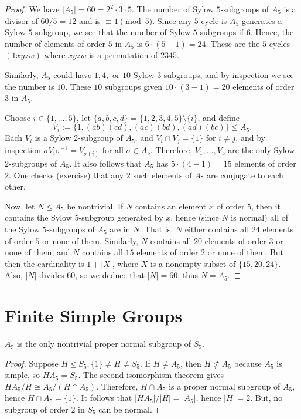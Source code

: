 \begin{proof}
    We have $|A_5|=60=2^2\cdot 3\cdot 5$. The number of Sylow $5$-subgroups of $A_5$ is a divisor of $60/5=12$ and is $\equiv 1 \pmod 5$. Since any $5$-cycle is $A_5$ generates a Sylow $5$-subgroup, we see that the number of Sylow $5$-subgroups if $6$. Hence, the number of elements of order $5$ in $A_5$ is $6\cdot (5-1)=24$. These are the $5$-cycles $(1xyzw)$ where $xyzw$ is a permutation of $2345$.

    Similarly, $A_5$ could have $1,4,$ or $10$ Sylow $3$-subgroups, and by inspection we see the number is $10$. These $10$ subgroups given $10\cdot(3-1)=20$ elements of order $3$ in $A_5$.

    Choose $i \in \{1,\dots,5\}$, let $\{a,b,c,d\}=\{1,2,3,4,5\}\setminus\{i\}$, and define
    $$V_i:=\{1,(ab)(cd),(ac)(bd),(ad)(bc)\} \leq A_5.$$
    Each $V_i$ is a Sylow $2$-subgroup of $A_5$, and $V_i \cap V_j = \{1\}$ for $i \neq j$, and by inspection $\sigma V_i\sigma ^{-1}=V_{\sigma(i)}$ for all $\sigma \in A_5$. Therefore, $V_1,\dots,V_5$ are the only Sylow $2$-subgroups of $A_5$. It also follows that $A_5$ has $5 \cdot (4-1)=15$ elements of order $2$. One checks (exercise) that any $2$ such elements of $A_5$ are conjugate to each other.

    Now, let $N \unlhd A_5$ be nontrivial. If $N$ contains an element $x$ of order $5$, then it contains the Sylow $5$-subgroup generated by $x$, hence (since $N$ is normal) all of the Sylow $5$-subgroups of $A_5$ are in $N$. That is, $N$ either contains all $24$ elements of order $5$ or none of them. Similarly, $N$ contains all $20$ elements of order $3$ or none of them, and $N$ contains all $15$ elements of order $2$ or none of them. But then the cardinality is $1+|X|$, where $X$ is a nonempty subset of $\{15,20,24\}$. Also, $|N|$ divides $60$, so we deduce that $|N|=60$, thus $N=A_5$.
\end{proof}

\section{Finite Simple Groups}
\begin{lem}
    $A_5$ is the only nontrivial proper normal subgroup of $S_5$.
\end{lem}

\begin{proof}
    Suppose $H \unlhd S_5, \{1\} \neq H \neq S_5$. If $H \neq A_5$, then $H \not \subset A_5$ because $A_5$ is simple, so $HA_5 = S_5$. The second isomorphism theorem gives $HA_5/H \cong A_5/(H \cap A_5)$. Therefore, $H \cap A_5$ is a proper normal subgroup of $A_5$, hence $H\cap A_5 = \{1\}$. It follows that $|HA_5|/|H|=|A_5|$, hence $|H|=2$. But, no subgroup of order $2$ in $S_5$ can be normal.
\end{proof}

